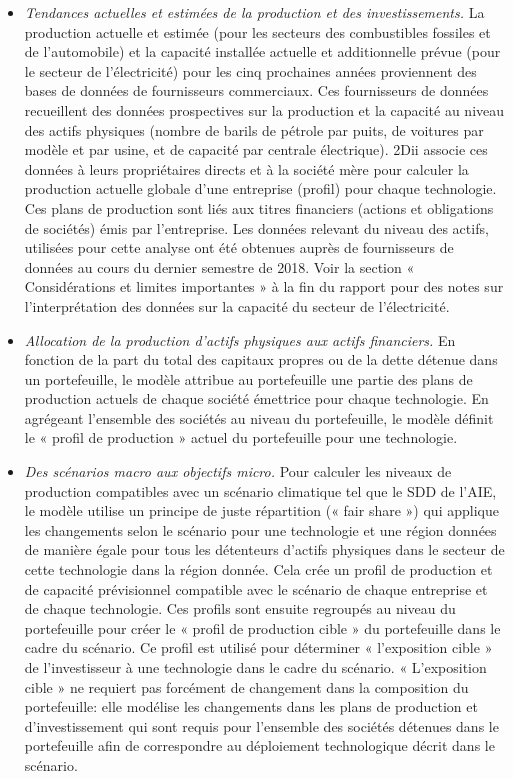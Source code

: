 \documentclass[10pt,table,a4]{article}\usepackage[]{graphicx}\usepackage[]{color}
\begin{document}
\begin{multicols}{2}
{		\begin{itemize}
			\item{\textit{Tendances actuelles et estimées de la production et des investissements.} La production actuelle et estimée (pour les secteurs des combustibles fossiles et de l'automobile) et la capacité installée actuelle et additionnelle prévue (pour le secteur de l'électricité) pour les cinq prochaines années proviennent des bases de données de fournisseurs commerciaux. Ces fournisseurs de données recueillent des données prospectives sur la production et la capacité au niveau des actifs physiques (nombre de barils de pétrole par puits, de voitures par modèle et par usine, et de capacité par centrale électrique). 2Dii associe ces données à leurs propriétaires directs et à la société mère pour calculer la production actuelle globale d'une entreprise (profil) pour chaque technologie. Ces plans de production sont liés aux titres financiers (actions et obligations de sociétés) émis par l'entreprise. Les données relevant du niveau des actifs, utilisées pour cette analyse ont été obtenues auprès de fournisseurs de données au cours du dernier semestre de 2018. Voir la section « Considérations et limites importantes » à la fin du rapport pour des notes sur l'interprétation des données sur la capacité du secteur de l'électricité.}
			
			\item{\textit{Allocation de la production d'actifs physiques aux actifs financiers.} En fonction de la part du total des capitaux propres ou de la dette détenue dans un portefeuille, le modèle attribue au portefeuille une partie des plans de production actuels de chaque société émettrice pour chaque technologie. En agrégeant l'ensemble des sociétés au niveau du portefeuille, le modèle définit le « profil de production » actuel du portefeuille pour une technologie.}
			
			\item{\textit{Des scénarios macro aux objectifs  micro.} Pour calculer les niveaux de production compatibles avec un scénario climatique tel que le SDD de l'AIE, le modèle utilise un principe de juste répartition (« fair share ») qui applique les changements selon le scénario pour une technologie et une région données de manière égale pour tous les détenteurs d'actifs physiques dans le secteur de cette technologie dans la région donnée. Cela crée un profil de production et de capacité prévisionnel compatible avec le scénario de chaque entreprise et de chaque technologie. Ces  profils  sont ensuite regroupés au niveau du portefeuille pour créer le « profil de production cible » du portefeuille dans le cadre du scénario. Ce profil est utilisé pour déterminer « l'exposition cible » de l'investisseur à une technologie dans le cadre du scénario. « L'exposition cible » ne requiert pas forcément de changement dans la composition du portefeuille: elle modélise les changements dans les plans de production et d'investissement qui sont requis pour l'ensemble des sociétés détenues dans le portefeuille afin de correspondre au déploiement technologique décrit dans le scénario.}
			

\end{itemize}}
\end{multicols}
\end{document}
